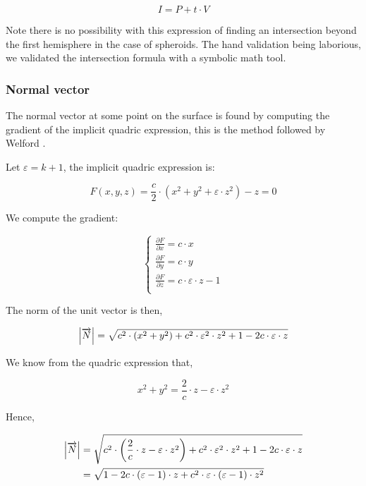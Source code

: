 \begin{equation}
I = P + t \cdot V
\end{equation}

Note there is no possibility with this expression of finding an intersection
beyond the first hemisphere in the case of spheroids. The hand validation being
laborious, we validated the intersection formula with a symbolic math tool.

\subsubsection{Normal vector}
The normal vector at some point on the surface is found by computing the
gradient of the implicit quadric expression, this is the method followed by
Welford \cite{Welford:1986}.

Let $\varepsilon = k+1$, the implicit quadric expression is:

\begin{equation}
F(x,y,z) = \frac{c}{2} \cdot (x^2 + y^2 + \varepsilon \cdot z^2) - z = 0
\end{equation}

We compute the gradient:

\begin{equation} \begin{cases}
\frac{\partial F}{\partial x} = c \cdot x\\
\frac{\partial F}{\partial y} = c \cdot y\\
\frac{\partial F}{\partial z} = c \cdot \varepsilon \cdot z - 1\\
\end{cases} \end{equation}

The norm of the unit vector is then,

\begin{equation}
\abs{\overrightarrow{N}} =
\sqrt{c^2 \cdot (x^2 + y^2) + c^2 \cdot \varepsilon^2
  \cdot z^2 + 1 - 2 c \cdot \varepsilon \cdot z} \\
\end{equation}

We know from the quadric expression that,

\begin{equation}
x^2 + y^2 = \frac{2}{c} \cdot z - \varepsilon \cdot z^2
\end{equation}

Hence,

\begin{equation} \begin{split}
\abs{\overrightarrow{N}} &=
\sqrt{c^2 \cdot \left( \frac{2}{c} \cdot z - \varepsilon \cdot z^2 \right)
  + c^2 \cdot \varepsilon^2 \cdot z^2 + 1 - 2 c \cdot \varepsilon \cdot z} \\
&= \sqrt{1 - 2 c \cdot (\varepsilon - 1) \cdot z + c^2 \cdot \varepsilon \cdot
         (\varepsilon - 1) \cdot z^2}
\end{split} \end{equation}

